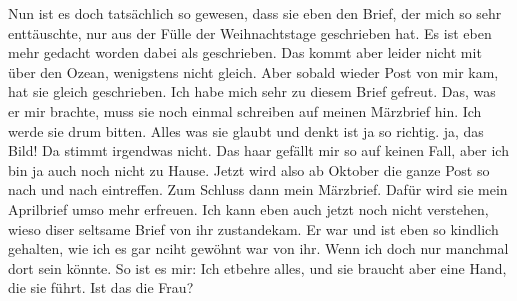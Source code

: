 \def\day{16. M\"{a}rz 1943}
\mktitle

Nun ist es doch tats\"{a}chlich so gewesen, dass sie eben den Brief, der mich so sehr entt\"{a}uschte, nur aus der F\"{u}lle der Weihnachtstage geschrieben hat.
Es ist eben mehr gedacht worden dabei als geschrieben.
Das kommt aber leider nicht mit \"{u}ber den Ozean, wenigstens nicht gleich.
Aber sobald wieder Post von mir kam, hat sie gleich geschrieben.
Ich habe mich sehr zu diesem Brief gefreut.
Das, was er mir brachte, muss sie noch einmal schreiben auf meinen M\"{a}rzbrief hin.
Ich werde sie drum bitten.
Alles was sie glaubt und denkt ist ja so richtig.
ja, das Bild!
Da stimmt irgendwas nicht.
Das haar gef\"{a}llt mir so auf keinen Fall, aber ich bin ja auch noch nicht zu Hause.
Jetzt wird also ab Oktober die ganze Post so nach und nach eintreffen.
Zum Schluss dann mein M\"{a}rzbrief.
Daf\"{u}r wird sie mein Aprilbrief umso mehr erfreuen.
Ich kann eben auch jetzt noch nicht verstehen, wieso diser seltsame Brief von ihr zustandekam. Er war und ist eben so kindlich gehalten, wie ich es gar nciht gew\"{o}hnt war von ihr.
Wenn ich doch nur manchmal dort sein k\"{o}nnte.
So ist es mir: Ich etbehre alles, und sie braucht aber eine Hand, die sie f\"{u}hrt.
Ist das die Frau?

\clearpage
